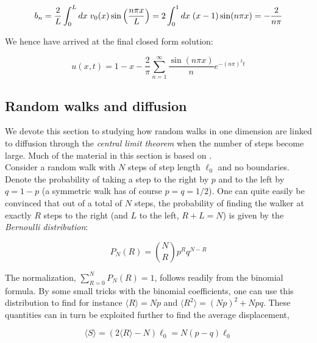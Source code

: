 \documentclass[a4paper, 11pt, notitlepage,english]{article}
\begin{document}
\begin{equation}
b_n = \frac{2}{L}\int_0^L dx \hspace{1mm} v_0(x)\sin\left( \frac{n \pi x}{L}\right) = 2\int_0^1 dx \hspace{1mm} (x-1) \sin(n\pi x) = -\frac{2}{n\pi}
\label{eq:Fourier_trick}
\end{equation}

We hence have arrived at the final closed form solution:

\begin{equation}
\boxed{u(x,t) = 1-x - \frac{2}{\pi} \sum_{n=1}^{\infty} \frac{\sin(n\pi x)}{n} e^{-(n\pi)^2t}}
\label{eq:Final_solution}
\end{equation}

\subsection{Random walks and diffusion}
\label{sec:RW}
We devote this section to studying how random walks in one dimension are linked to diffusion through the \emph{central limit theorem} when the number of steps become large. Much of the material in this section is based on \cite{Komp4130}. \\ 

Consider a random walk with $N$ steps of step length $\ell_0$ and no boundaries. Denote the probability of taking a step to the right by $p$ and to the left by $q = 1-p$ (a symmetric walk has of course $p=q=1/2$). One can quite easily be convinced that out of a total of $N$ steps, the probability of finding the walker at exactly $R$ steps to the right (and $L$ to the left, $R+L = N$) is given by the \emph{Bernoulli distribution}:

\begin{equation}
P_N(R) = \binom{N}{R} p^R q^{N-R}
\label{eq:RW_Bernoulli}
\end{equation}

The normalization, $\sum_{R=0}^N P_N(R) = 1$, follows readily from the binomial formula. By some small tricks with the binomial coefficients, one can use this distribution to find for instance $\langle R \rangle = Np$ and $\langle R^2 \rangle = (Np)^2 + Npq$. These quantities can in turn be exploited further to find the average displacement, 

\begin{equation}
\langle S \rangle = (2 \langle R \rangle - N)\ell_0 = N(p-q)\ell_0
\label{eq:RW_displacement}
\end{equation}
\end{document}
